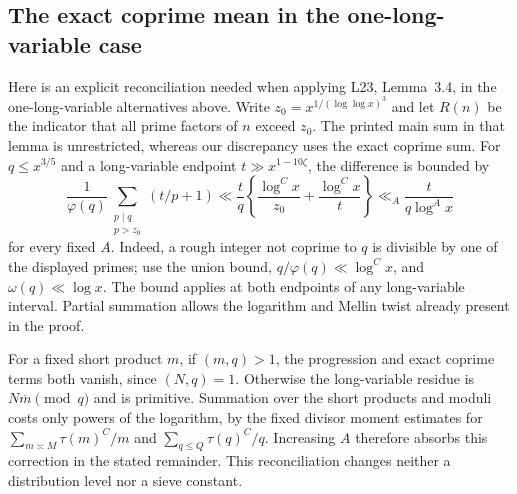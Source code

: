 \subsection{The exact coprime mean in the one-long-variable case}
\label{sec:one-long-coprime-mean}
Here is an explicit reconciliation needed when applying L23,
Lemma~3.4, in the one-long-variable alternatives above.
Write $z_0=x^{1/(\log\log x)^3}$ and let $R(n)$ be the indicator
that all prime factors of $n$ exceed $z_0$. The printed main
sum in that lemma is unrestricted, whereas our discrepancy uses
the exact coprime sum. For $q\le x^{3/5}$ and a long-variable
endpoint $t\gg x^{1-10\zeta}$, the difference is bounded by
\[
 \frac{1}{\varphi(q)}
 \sum_{\substack{p\mid q\\p>z_0}}(t/p+1)
 \ll \frac tq\left\{\frac{\log^C x}{z_0}
                         +\frac{\log^C x}{t}\right\}
 \ll_A\frac{t}{q\log^A x}
\]
for every fixed $A$. Indeed, a rough integer not coprime to
$q$ is divisible by one of the displayed primes; use the union
bound, $q/\varphi(q)\ll\log^C x$, and
$\omega(q)\ll\log x$. The bound applies at both endpoints
of any long-variable interval. Partial summation allows the
logarithm and Mellin twist already present in the proof.

For a fixed short product $m$, if $(m,q)>1$, the progression
and exact coprime terms both vanish, since $(N,q)=1$.
Otherwise the long-variable residue is $N\overline m\pmod q$
and is primitive. Summation over the short products and
moduli costs only powers of the logarithm, by the fixed
divisor moment estimates for $\sum_{m\asymp M}\tau(m)^C/m$
and $\sum_{q\le Q}\tau(q)^C/q$. Increasing $A$ therefore
absorbs this correction in the stated remainder. This
reconciliation changes neither a distribution level nor a
sieve constant.
